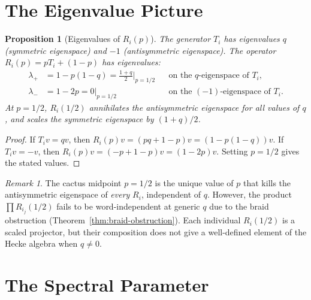 \documentclass[11pt]{article}
\newtheorem{proposition}[theorem]{Proposition}
\theoremstyle{definition}
\theoremstyle{remark}
\newtheorem{remark}[theorem]{Remark}
\begin{document}
\section{The Eigenvalue Picture}

\begin{proposition}[Eigenvalues of $R_i(p)$]\label{prop:eigenvalues}
The generator $T_i$ has eigenvalues $q$ (symmetric eigenspace) and $-1$
(antisymmetric eigenspace). The operator $R_i(p) = pT_i + (1-p)$ has
eigenvalues:
\begin{align}
\lambda_+ &= 1 - p(1-q) = \frac{1+q}{2}\Big|_{p=1/2}
  & &\text{on the $q$-eigenspace of $T_i$}, \label{eq:eig-plus}\\
\lambda_- &= 1 - 2p = 0\Big|_{p=1/2}
  & &\text{on the $(-1)$-eigenspace of $T_i$}. \label{eq:eig-minus}
\end{align}
At $p = 1/2$, $R_i(1/2)$ annihilates the antisymmetric eigenspace for
\emph{all} values of $q$, and scales the symmetric eigenspace by $(1+q)/2$.
\end{proposition}

\begin{proof}
If $T_i v = qv$, then $R_i(p)v = (pq + 1 - p)v = (1 - p(1-q))v$.
If $T_i v = -v$, then $R_i(p)v = (-p + 1 - p)v = (1-2p)v$.
Setting $p = 1/2$ gives the stated values.
\end{proof}

\begin{remark}
The cactus midpoint $p = 1/2$ is the unique value of $p$ that kills the
antisymmetric eigenspace of \emph{every} $R_i$, independent of $q$. However,
the product $\prod R_{i_j}(1/2)$ fails to be word-independent at generic
$q$ due to the braid obstruction (Theorem~\ref{thm:braid-obstruction}).
Each individual $R_i(1/2)$ is a scaled projector, but their composition
does not give a well-defined element of the Hecke algebra when $q \neq 0$.
\end{remark}

\section{The Spectral Parameter}
\end{document}

